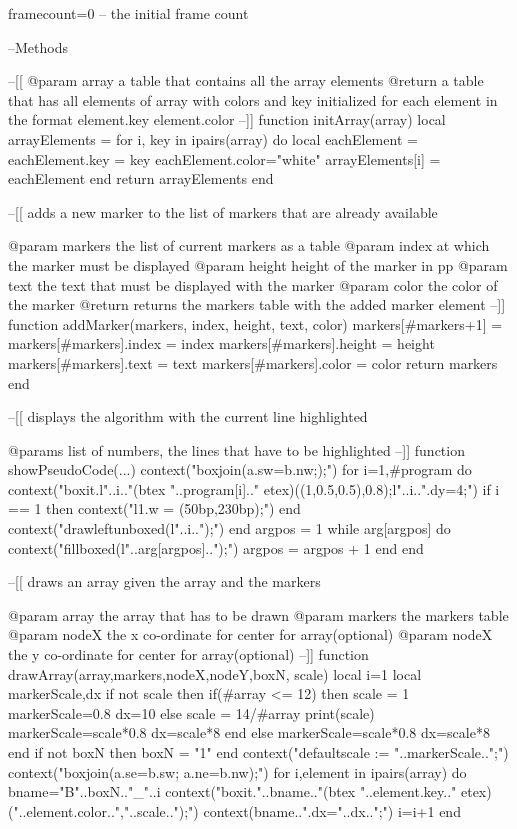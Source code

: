 \startluacode
framecount=0 -- the initial frame count

--Methods

--[[
@param array a table that contains all the array elements
@return a table that has all elements of array with colors and key initialized for each element in the format
			element.key
			element.color
--]]
function initArray(array)
	local arrayElements = {}
	for i, key in ipairs(array) do
		local eachElement = {}
		eachElement.key = key
		eachElement.color="white"
		arrayElements[i] = eachElement
	end
	return arrayElements
end

--[[
adds a new marker to the list of markers that are already available

@param markers the list of current markers as a table
@param index at which the marker must be displayed
@param height height of the marker in pp
@param text the text that must be displayed with the marker
@param color the color of the marker
@return returns the markers table with the added marker element
--]]
function addMarker(markers, index, height, text, color)
	markers[#markers+1] = {}
	markers[#markers].index = index
	markers[#markers].height = height
	markers[#markers].text = text
	markers[#markers].color = color
	return markers
end

--[[
displays the algorithm with the current line highlighted

@params list of numbers, the lines that have to be highlighted
--]]
function showPseudoCode(...)				
	context("boxjoin(a.sw=b.nw;);")
	for i=1,#program do
		context("boxit.l"..i.."(btex "..program[i].."  etex)((1,0.5,0.5),0.8);l"..i..".dy=4;")
		if i == 1 then
			context("l1.w = (50bp,230bp);")
		end
		context("drawleftunboxed(l"..i..");")
	end
	argpos = 1
	while arg[argpos] do  
		context("fillboxed(l"..arg[argpos]..");")
		argpos = argpos + 1
	end
end

--[[
draws an array given the array and the markers

@param array the array that has to be drawn
@param markers the markers table
@param nodeX the x co-ordinate for center for array(optional)
@param nodeX the y co-ordinate for center for array(optional)
--]]
function drawArray(array,markers,nodeX,nodeY,boxN, scale)
	local i=1
	local markerScale,dx
	if not scale then
		if(#array <= 12) then
			scale = 1
			markerScale=0.8
			dx=10
		else
			scale = 14/#array
			print(scale)
			markerScale=scale*0.8
			dx=scale*8
		end
	else
		markerScale=scale*0.8
		dx=scale*8
	end
	if not boxN then
		boxN = "1"
	end
	context("defaultscale := "..markerScale..";")
	context("boxjoin(a.se=b.sw; a.ne=b.nw);")
	for i,element in ipairs(array) do
		bname="B"..boxN.."_"..i
		context("boxit."..bname.."(btex "..element.key.." etex)("..element.color..","..scale..");")
		context(bname..".dx="..dx..";")
		i=i+1
	end

